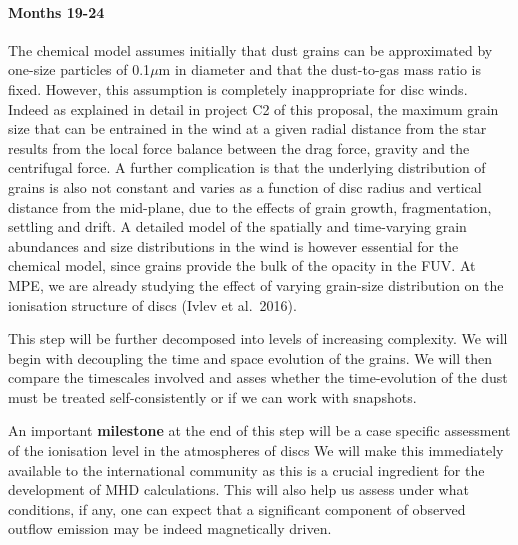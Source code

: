 \documentclass[10pt,fleqn,twoside]{article}
\begin{document}
\paragraph{ Months 19-24}

 The chemical model assumes initially that dust grains can be approximated by one-size particles of 0.1${\mu}$m in diameter and that the dust-to-gas mass ratio is fixed.  However, this assumption is completely inappropriate for disc winds. Indeed as explained in detail in project C2 of this proposal, the maximum grain size that can be entrained in the wind at a given radial distance from the star results from the local force balance between the drag force, gravity and the centrifugal force. A further complication is that the underlying distribution of grains is also not constant and varies as a function of disc radius and vertical distance from the mid-plane, due to the effects of grain growth, fragmentation, settling and drift. A detailed model of the spatially and time-varying grain abundances and size distributions in the wind is however essential for the chemical model, since grains provide the bulk of the opacity in the FUV.   At MPE, we are already studying the effect of varying grain-size distribution on the ionisation structure of discs (Ivlev et al.\ 2016). 

This step will be further decomposed into levels of increasing complexity. We will begin with decoupling the time and space evolution of the grains. We will then compare the timescales involved and asses whether the time-evolution of the dust must be treated self-consistently or if we can work with snapshots. 

An important {\bf milestone} at the end of this step will be a case specific assessment of the ionisation level in the atmospheres of discs We will make this immediately available to the international community as this is a crucial ingredient for the development of MHD calculations. This will also help us assess under what conditions, if any, one can expect that a significant component of observed outflow emission may be indeed magnetically driven. 
\end{document}
